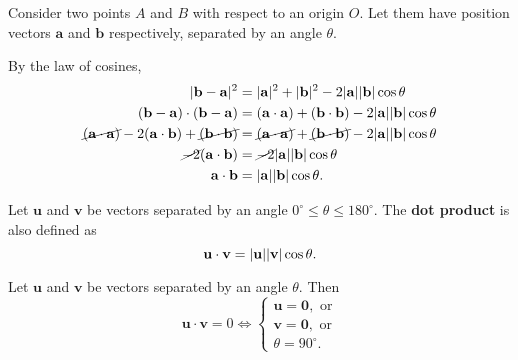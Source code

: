 \documentclass[12pt]{article}
\renewcommand{\vec}{\mathbf}
\begin{document}
\begin{disc}
	Consider two points \(A\) and \(B\) with respect to an origin \(O\). 
	Let them have position vectors \(\vec{a}\) and \(\vec{b}\) respectively, separated by an angle \(\theta\).
	\begin{figure}[H]
		\centering
	\end{figure}
	By the law of cosines,
	\begin{align*}
		 \abs{\vec{b} - \vec{a}}^2 &= \abs{\vec{a}}^2 + \abs{\vec{b}}^2 - 2 \abs{\vec{a}} \abs{\vec{b}} \cos \theta  \\
		  (\vec{b} - \vec{a}) \cdot (\vec{b} - \vec{a}) &= (\vec{a} \cdot \vec{a}) + (\vec{b} \cdot \vec{b}) - 2 \abs{\vec{a}} \abs{\vec{b}} \cos \theta \\
		  \cancel{(\vec{a} \cdot \vec{a})} - 2 (\vec{a} \cdot \vec{b}) + \cancel{(\vec{b} \cdot \vec{b})} &= \cancel{(\vec{a} \cdot \vec{a})} + \cancel{(\vec{b} \cdot \vec{b})} - 2 \abs{\vec{a}} \abs{\vec{b}} \cos \theta \\
		  \cancel{-2} (\vec{a} \cdot \vec{b}) &= \cancel{-2} \abs{\vec{a}} \abs{\vec{b}} \cos \theta \\
		  \vec{a} \cdot \vec{b} &= \abs{\vec{a}} \abs{\vec{b}} \cos \theta.
	\end{align*}
\end{disc}

\begin{defn} \label{defn:gdpdt}
	Let \(\vec{u}\) and \(\vec{v}\) be vectors separated by an angle \(0^\circ \leq \theta \leq 180^\circ\).
	The \textbf{dot product} is also defined as 
	\[ \vec{u} \cdot \vec{v} = \abs{\vec{u}} \abs{\vec{v}} \cos \theta. \] 
\end{defn}

\begin{thm} \label{thm:perptest}
	Let \(\vec{u}\) and \(\vec{v}\) be vectors separated by an angle \(\theta\).
	Then
	\[ \vec{u} \cdot \vec{v} = 0 \iff 
		\begin{cases}
			\vec{u} = \vec{0}, \text{ or} \\
			\vec{v} = \vec{0}, \text{ or} \\
			\theta = 90^\circ.
		\end{cases}
	\] 
\end{thm}
\end{document}
